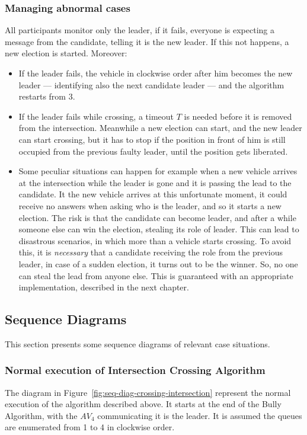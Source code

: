 \documentclass{memoir}
\begin{document}
\subsubsection{Managing abnormal cases}\label{subsec:abnormal-cases}

All participants monitor only the leader, if it fails, everyone is expecting a message from the candidate, telling it is the new leader. If this not happens, a new election is started. Moreover:

\begin{itemize}
	\item If the leader fails, the vehicle in clockwise order after him becomes the new leader --- identifying also the next candidate leader --- and the algorithm restarts from 3.
	\item If the leader fails while crossing, a timeout $T$ is needed before it is removed from the intersection. Meanwhile a new election can start, and the new leader can start crossing, but it has to stop if the position in front of him is still occupied from the previous faulty leader, until the position gets liberated.
	\item Some peculiar situations can happen for example when a new vehicle arrives at the intersection while the leader is gone and it is passing the lead to the candidate. It the new vehicle arrives at this unfortunate moment, it could receive no answers when asking who is the leader, and so it starts a new election. The risk is that the candidate can become leader, and after a while someone else can win the election, stealing its role of leader. This can lead to disastrous scenarios, in which more than a vehicle starts crossing. To avoid this, it is \emph{necessary} that a candidate receiving the role from the previous leader, in case of a sudden election, it turns out to be the winner. So, no one can steal the lead from anyone else. This is guaranteed with an appropriate implementation, described in the next chapter.
\end{itemize}

\subsection{Sequence Diagrams}
This section presents some sequence diagrams of relevant case situations.

\subsubsection{Normal execution of Intersection Crossing Algorithm}
The diagram in Figure~\ref{fig:seq-diag-crossing-intersection} represent the normal execution of the algorithm described above. It starts at the end of the Bully Algorithm, with the $AV_4$ communicating it is the leader. It is assumed the queues are enumerated from 1 to 4 in clockwise order.
\end{document}
